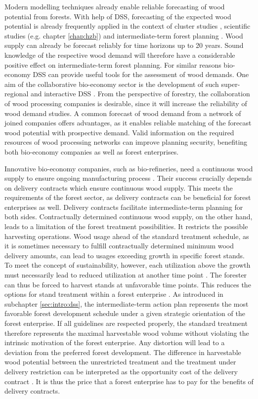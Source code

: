 Modern modelling techniques already enable reliable forecasting of wood potential from forests. With help of DSS, forecasting of the expected wood potential is already frequently applied in the context of cluster studies \citep[e.g.][]{bmel_2016}, scientific studies (e.g. chapter \ref{chap:hzb}) and intermediate-term forest planning \citep[e.g.][]{bockmann_2004}. Wood supply can already be forecast reliably for time horizons up to 20 years. Sound knowledge of the respective wood demand will therefore have a considerable positive effect on intermediate-term forest planning. For similar reasons bio-economy DSS can provide useful tools for the assessment of wood demands. One aim of the collaborative bio-economy sector is the development of such super-regional and interactive DSS \citep[p. 362]{ollikainen_2014}. From the perspective of forestry, the collaboration of wood processing companies is desirable, since it will increase the reliability of wood demand studies. A common forecast of wood demand from a network of joined companies offers advantages, as it enables reliable matching of the forecast wood potential with prospective demand. Valid information on the required resources of wood processing networks can improve planning security, benefiting both bio-economy companies as well as forest enterprises.

Innovative bio-economy companies, such as bio-refineries, need a continuous wood supply to ensure ongoing manufacturing process \citep[p. 362]{ollikainen_2014}. Their success crucially depends on delivery contracts which ensure continuous wood supply. This meets the requirements of the forest sector, as delivery contracts can be beneficial for forest enterprises as well. Delivery contracts facilitate intermediate-term planning for both sides. Contractually determined continuous wood supply, on the other hand, leads to a limitation of the forest treatment possibilities. It restricts the possible harvesting operations. Wood usage ahead of the standard treatment schedule, as it is sometimes necessary to fulfill contractually determined minimum wood delivery amounts, can lead to usages exceeding growth in specific forest stands. To meet the concept of sustainability, however, each utilization above the growth must necessarily lead to reduced utilization at another time point \citep[p. 67]{mohring_1997}. The forester can thus be forced to harvest stands at unfavorable time points. This reduces the options for stand treatment within a forest enterprise \citep[p. 351-352]{mohring_2010}. As introduced in subchapter \ref{sec:intro:dss}, the intermediate-term action plan represents the most favorable forest development schedule under a given strategic orientation of the forest enterprise. If all guidelines are respected properly, the standard treatment therefore represents the maximal harvestable wood volume without violating the intrinsic motivation of the forest enterprise. Any distortion will lead to a deviation from the preferred forest development. The difference in harvestable wood potential between the unrestricted treatment and the treatment under delivery restriction can be interpreted as the opportunity cost of the delivery contract \citep[p. 353]{mohring_2010}. It is thus the price that a forest enterprise has to pay for the benefits of delivery contracts.

